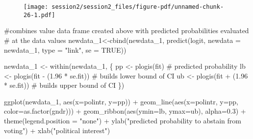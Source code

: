 \documentclass[
  letterpaper,
  DIV=11,
  numbers=noendperiod]{scrreprt}
\newenvironment{Shaded}{\begin{snugshade}}{\end{snugshade}}
\newcommand{\AttributeTok}[1]{\textcolor[rgb]{0.40,0.45,0.13}{#1}}
\newcommand{\CommentTok}[1]{\textcolor[rgb]{0.37,0.37,0.37}{#1}}
\newcommand{\ConstantTok}[1]{\textcolor[rgb]{0.56,0.35,0.01}{#1}}
\newcommand{\FloatTok}[1]{\textcolor[rgb]{0.68,0.00,0.00}{#1}}
\newcommand{\FunctionTok}[1]{\textcolor[rgb]{0.28,0.35,0.67}{#1}}
\newcommand{\NormalTok}[1]{\textcolor[rgb]{0.00,0.23,0.31}{#1}}
\newcommand{\OtherTok}[1]{\textcolor[rgb]{0.00,0.23,0.31}{#1}}
\newcommand{\SpecialCharTok}[1]{\textcolor[rgb]{0.37,0.37,0.37}{#1}}
\newcommand{\StringTok}[1]{\textcolor[rgb]{0.13,0.47,0.30}{#1}}
\begin{document}
\begin{figure}[H]

{\centering \texttt{[image: session2/session2\_files/figure-pdf/unnamed-chunk-26-1.pdf]}

}

\end{figure}

\begin{Shaded}
\begin{Highlighting}[]
\CommentTok{\#combines value data frame created above with predicted probabilities evaluated }
\CommentTok{\# at the data values}
\NormalTok{newdata\_1}\OtherTok{\textless{}{-}}\FunctionTok{cbind}\NormalTok{(newdata\_1, }\FunctionTok{predict}\NormalTok{(logit, }\AttributeTok{newdata =}\NormalTok{ newdata\_1, }\AttributeTok{type =} \StringTok{"link"}\NormalTok{, }\AttributeTok{se =} \ConstantTok{TRUE}\NormalTok{)) }
\end{Highlighting}
\end{Shaded}

\begin{Shaded}
\begin{Highlighting}[]
\NormalTok{newdata\_1 }\OtherTok{\textless{}{-}} \FunctionTok{within}\NormalTok{(newdata\_1, \{}
\NormalTok{  pp }\OtherTok{\textless{}{-}} \FunctionTok{plogis}\NormalTok{(fit)                   }\CommentTok{\# predicted probability }
\NormalTok{  lb }\OtherTok{\textless{}{-}} \FunctionTok{plogis}\NormalTok{(fit }\SpecialCharTok{{-}}\NormalTok{ (}\FloatTok{1.96} \SpecialCharTok{*}\NormalTok{ se.fit)) }\CommentTok{\# builds lower bound of CI}
\NormalTok{  ub }\OtherTok{\textless{}{-}} \FunctionTok{plogis}\NormalTok{(fit }\SpecialCharTok{+}\NormalTok{ (}\FloatTok{1.96} \SpecialCharTok{*}\NormalTok{ se.fit)) }\CommentTok{\# builds upper bound of CI}
\NormalTok{\})}
\end{Highlighting}
\end{Shaded}

\begin{Shaded}
\begin{Highlighting}[]
\FunctionTok{ggplot}\NormalTok{(newdata\_1, }\FunctionTok{aes}\NormalTok{(}\AttributeTok{x=}\NormalTok{polintr, }\AttributeTok{y=}\NormalTok{pp)) }\SpecialCharTok{+}  
  \FunctionTok{geom\_line}\NormalTok{(}\FunctionTok{aes}\NormalTok{(}\AttributeTok{x=}\NormalTok{polintr, }\AttributeTok{y=}\NormalTok{pp, }\AttributeTok{color=}\FunctionTok{as.factor}\NormalTok{(gndr))) }\SpecialCharTok{+}
  \FunctionTok{geom\_ribbon}\NormalTok{(}\FunctionTok{aes}\NormalTok{(}\AttributeTok{ymin=}\NormalTok{lb, }\AttributeTok{ymax=}\NormalTok{ub), }\AttributeTok{alpha=}\FloatTok{0.3}\NormalTok{) }\SpecialCharTok{+}
  \FunctionTok{theme}\NormalTok{(}\AttributeTok{legend.position =} \StringTok{"none"}\NormalTok{) }\SpecialCharTok{+}
  \FunctionTok{ylab}\NormalTok{(}\StringTok{"predicted probability to abstain from voting"}\NormalTok{) }\SpecialCharTok{+}
  \FunctionTok{xlab}\NormalTok{(}\StringTok{"political interest"}\NormalTok{)}
\end{Highlighting}
\end{Shaded}
\end{document}
